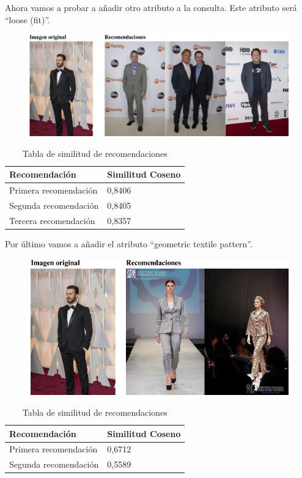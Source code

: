 \documentclass[12pt]{report} %
\begin{document}
	Ahora vamos a probar a añadir otro atributo a la consulta. Este atributo será ``loose (fit)''.
	\begin{figure}[H]
		{\includegraphics[scale=0.6]{atributos2.png}}
	\end{figure}
	\begin{table}[H]
		\centering
		\caption{Tabla de similitud de recomendaciones}
		\begin{tabular}{ll}
				\textbf{Recomendación} & \textbf{Similitud Coseno} \\
				\midrule
				Primera recomendación & 0,8406 \\
				Segunda recomendación & 0,8405 \\
				Tercera recomendación & 0,8357 \\
				\bottomrule
		\end{tabular}
	\end{table}

	Por último vamos a añadir el atributo ``geometric textile pattern''.

		\begin{figure}[H]
		{\includegraphics[scale=0.8]{atributos3.png}}
	\end{figure}
	\begin{table}[H]
		\centering
		\caption{Tabla de similitud de recomendaciones}
		\begin{tabular}{ll}
				\textbf{Recomendación} & \textbf{Similitud Coseno} \\
				\midrule
				Primera recomendación & 0,6712 \\
				Segunda recomendación & 0,5589 \\
				\bottomrule
		\end{tabular}
	\end{table}
\end{document}
